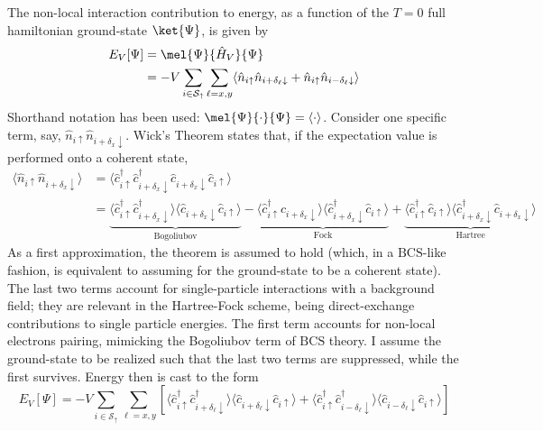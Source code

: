 The non-local interaction contribution to energy, as a function of the $T=0$ full hamiltonian ground-state $\ket{\Psi}$, is given by
\[
\begin{aligned}
	E_V [\Psi] &= \mel{\Psi}{\hat H_V}{\Psi} \\
	&= -V \sum_{i \in \mathcal{S}_\uparrow} \sum_{\ell = x,y} \langle
	\hat n_{i\uparrow} \hat n_{i + \delta_\ell \downarrow} + \hat n_{i\uparrow} \hat n_{i - \delta_\ell \downarrow}
	\rangle 
\end{aligned}
\]
Shorthand notation has been used: $\mel{\Psi}{\cdot}{\Psi} = \langle \cdot \rangle$. Consider one specific term, say, $\hat n_{i\uparrow} \hat n_{i + \delta_x \downarrow}$. Wick's Theorem states that, if the expectation value is performed onto a coherent state,
\[
\begin{aligned}
	\langle 
	\hat n_{i\uparrow} \hat n_{i + \delta_x \downarrow}
	\rangle &= \langle 
	\hat c_{i\uparrow}^\dagger \hat c_{i + \delta_x \downarrow}^\dagger \hat c_{i + \delta_x \downarrow} \hat c_{i\uparrow} 
	\rangle \\
	&= 
	\underbrace{
		\langle 
			\hat c_{i\uparrow}^\dagger \hat c_{i + \delta_x \downarrow}^\dagger
		\rangle \langle	
			\hat c_{i + \delta_x \downarrow} \hat c_{i\uparrow} 
		\rangle 
	}_{\text{Bogoliubov}}
	- 
	\underbrace{
		\langle 
			\hat c_{i\uparrow}^\dagger \hat c_{i + \delta_x \downarrow}
		\rangle \langle	
			\hat c_{i + \delta_x \downarrow}^\dagger \hat c_{i\uparrow} 
		\rangle 
	}_{\text{Fock}}
	+ 
	\underbrace{
		\langle 
			\hat c_{i\uparrow}^\dagger \hat c_{i\uparrow}
		\rangle \langle	
			\hat c_{i + \delta_x \downarrow}^\dagger \hat c_{i + \delta_x \downarrow} 
		\rangle
	}_{\text{Hartree}}
\end{aligned}
\]
As a first approximation, the theorem is assumed to hold (which, in a $\mathrm{BCS}$-like fashion, is equivalent to assuming for the ground-state to be a coherent state). The last two terms account for single-particle interactions with a background field; they are relevant in the Hartree-Fock scheme, being direct-exchange contributions to single particle energies. The first term accounts for non-local electrons pairing, mimicking the Bogoliubov term of $\mathrm{BCS}$ theory. {\color{tabred}I assume the ground-state to be realized such that the last two terms are suppressed, while the first survives.} Energy then is cast to the form
\[
	E_V[\Psi] = -V \sum_{i \in \mathcal{S}_\uparrow} \sum_{\ell = x,y}
	\left[
		\langle
			\hat c_{i\uparrow}^\dagger \hat c_{i + \delta_\ell \downarrow}^\dagger
		\rangle \langle	
			\hat c_{i + \delta_\ell \downarrow} \hat c_{i\uparrow} 
		\rangle + \langle 
			\hat c_{i\uparrow}^\dagger \hat c_{i - \delta_\ell \downarrow}^\dagger
		\rangle \langle	
			\hat c_{i - \delta_\ell \downarrow} \hat c_{i\uparrow} 
		\rangle
	\right]
\]

